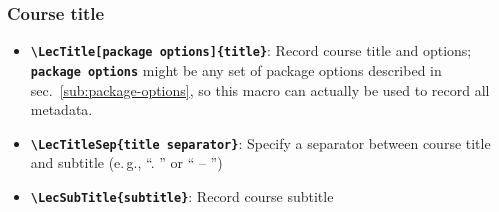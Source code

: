 \documentclass[english]{article}
\newcommand*\jmacro[1]{\textbf{\texttt{#1}}}
\newcommand*\jcsmacro[1]{\jmacro{\textbackslash{#1}}}
\newcommand*\joption[1]{\textbf{\texttt{#1}}}
\newcommand*\jparam[1]{\angus #1\angud}
\begin{document}
\subsubsection{Course title}
\begin{itemize}
\item \jcsmacro{LecTitle[\jparam{package options}]\{\jparam{title}\}}: Record course title and options;
\joption{\jparam{package options}} might be any set of package options described
in sec.~\ref{sub:package-options}, so this macro can actually be used to record
all metadata.
\item \jcsmacro{LecTitleSep\{\jparam{title separator}\}}: Specify a separator between course
title and subtitle (e.\,g., ``. '' or `` -- '')
\item \jcsmacro{LecSubTitle\{\jparam{subtitle}\}}: Record course subtitle
\end{itemize}
\end{document}
